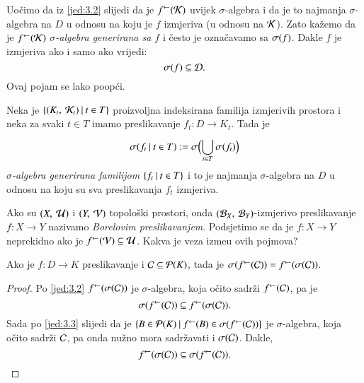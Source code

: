 Uo\v cimo da iz \eqref{jed:3.2} slijedi da je ${f}^{\leftarrow}(\mathcal{K})$ uvijek $\sigma$-algebra i da je to najmanja $\sigma$-algebra na $D$ u odnosu na koju je $f$ izmjeriva (u odnosu na $\mathcal{K}$).
Zato ka\v zemo da je ${f}^{\leftarrow}(\mathcal{K})$ \emph{$\sigma$-algebra generirana sa $f$} i \v cesto je ozna\v cavamo sa \emph{$\sigma({f})$}.
Dakle $f$ je izmjeriva ako i samo ako vrijedi:
\begin{equation*}
    \sigma({f}) \subseteq \mathcal{D}.
\end{equation*}
Ovaj pojam se lako poop\' ci.
\begin{defn}    \label{defn:3.3-2}
    Neka je $\{{(K_t, \: \mathcal{K}_t)} \: | \: {t \in T}\}$ proizvoljna indeksirana familija izmjerivih prostora i neka za svaki $t \in T$ imamo preslikavanje $f_t : D \to K_t$.
    Tada je
    \begin{equation*}
        \sigma({f_t} \: | \: {t \in T}) := \sigma \Big( {\bigcup\limits_{t \in T}^{} \sigma({f_t})} \Big)
    \end{equation*}
    \emph{$\sigma$-algebra generirana familijom $\{{f_t} \: | \: {t \in T}\}$} i to je najmanja $\sigma$-algebra na $D$ u odnosu na koju su sva preslikavanja $f_t$ izmjeriva.
\end{defn}

Ako su $(X, \: \mathcal{U})$ i $(Y, \: \mathcal{V})$ topolo\v ski prostori, onda $(\mathcal{B}_{X}, \: \mathcal{B}_{Y})$-izmjerivo preslikavanje $f: X \to Y$ nazivamo \emph{Borelovim preslikavanjem}.
Podsjetimo se da je $f: X \to Y$ neprekidno ako je ${f}^{\leftarrow}(\mathcal{V}) \subseteq \mathcal{U}$.
Kakva je veza izme\dj u ovih pojmova?

\begin{lm}  \label{lm:3.4}
    Ako je $f: D \to K$ preslikavanje i $\mathcal{C} \subseteq \mathcal{P}({K})$, tada je $\sigma({{f}^{\leftarrow}(\mathcal{C})}) = {f}^{\leftarrow} (\sigma({\mathcal{C}}))$.
\end{lm}

\begin{proof}
    Po \eqref{jed:3.2} ${f}^{\leftarrow}(\sigma({\mathcal{C}}))$ je $\sigma$-algebra, koja o\v cito sadr\v zi ${f}^{\leftarrow}(\mathcal{C})$, pa je
    \begin{equation*}
        \sigma({{f}^{\leftarrow}(\mathcal{C})}) \subseteq {f}^{\leftarrow}(\sigma({\mathcal{C}})).
    \end{equation*}
    Sada po \eqref{jed:3.3} slijedi da je $\{{B \in \mathcal{P}({K})} \: | \: {{f}^{\leftarrow}(B) \in \sigma({{f}^{\leftarrow}(\mathcal{C})})}\}$ je $\sigma$-algebra, koja o\v cito sadr\v zi $\mathcal{C}$, pa onda nu\v zno mora sadr\v zavati i $\sigma({\mathcal{C}})$.
    Dakle,
    \begin{equation*}
        {f}^{\leftarrow}(\sigma({\mathcal{C}})) \subseteq \sigma({{f}^{\leftarrow}(\mathcal{C})}).
    \end{equation*}
\end{proof}

